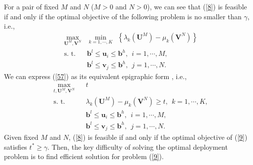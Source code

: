 \documentclass[journal, draftcls, one column, 12pt]{IEEEtran}
\begin{document}
For a pair of fixed $M$ and $N$ ($M>0$ and $N>0$), we can see that (\ref{8}) is feasible if and only if the optimal objective of the following problem is no smaller than $\gamma$, i.e.,
\begin{subequations}
\label{57}
   \begin{align}
    & \underset{\mathbf{U}^M,\mathbf{V}^N}{\text{max}} & \min_{k=1,\cdots,K}\ \  \left\{\lambda_k \left(\mathbf{U}^M\right) -\mu_k\left(\mathbf{V}^N\right)\right\}\\
    & \text{s. t.}  & \mathbf{b}^l\leq \mathbf{u}_i\leq \mathbf{b}^h,\ \ i=1,\cdots,M,\\
    & &  \mathbf{b}^l\leq \mathbf{v}_j\leq \mathbf{b}^h,\ \ j=1,\cdots,N.
   \end{align}
\end{subequations}
We can express (\ref{57}) as its equivalent epigraphic form \cite{2004:Boyd}, i.e.,
\begin{equation}
\label{9}
   \begin{aligned}
    &\underset{t,\mathbf{U}^M,\mathbf{V}^N}{\text{max}} & &  t\\
    &\text{s. t.}    & & \lambda_k \left(\mathbf{U}^M\right) -\mu_k\left(\mathbf{V}^N\right) \geq t, \ \ k=1,\cdots,K, \\
    & & & \mathbf{b}^l\leq \mathbf{u}_i\leq \mathbf{b}^h,\ \ i=1,\cdots,M,\\
    & & & \mathbf{b}^l\leq \mathbf{v}_j\leq \mathbf{b}^h,\ \ j=1,\cdots,N.
   \end{aligned}
\end{equation}
Given fixed $M$ and $N$, (\ref{8}) is feasible if and only if the optimal objective of (\ref{9}) satisfies $t^* \geq \gamma$. Then, the key difficulty of solving the optimal deployment problem is to find efficient solution for problem (\ref{9}).
\end{document}
